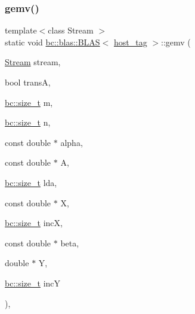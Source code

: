 \subsubsection{\texorpdfstring{gemv()}{gemv()}\hspace{0.1cm}{\footnotesize\ttfamily [1/2]}}
{\footnotesize\ttfamily template$<$class Stream $>$ \\
static void \hyperlink{structbc_1_1blas_1_1BLAS}{bc\+::blas\+::\+B\+L\+AS}$<$ \hyperlink{structbc_1_1host__tag}{host\+\_\+tag} $>$\+::gemv (\begin{DoxyParamCaption}\item[{\hyperlink{classbc_1_1streams_1_1Stream}{Stream}}]{stream,  }\item[{bool}]{transA,  }\item[{\hyperlink{namespacebc_aaf8e3fbf99b04b1b57c4f80c6f55d3c5}{bc\+::size\+\_\+t}}]{m,  }\item[{\hyperlink{namespacebc_aaf8e3fbf99b04b1b57c4f80c6f55d3c5}{bc\+::size\+\_\+t}}]{n,  }\item[{const double $\ast$}]{alpha,  }\item[{const double $\ast$}]{A,  }\item[{\hyperlink{namespacebc_aaf8e3fbf99b04b1b57c4f80c6f55d3c5}{bc\+::size\+\_\+t}}]{lda,  }\item[{const double $\ast$}]{X,  }\item[{\hyperlink{namespacebc_aaf8e3fbf99b04b1b57c4f80c6f55d3c5}{bc\+::size\+\_\+t}}]{incX,  }\item[{const double $\ast$}]{beta,  }\item[{double $\ast$}]{Y,  }\item[{\hyperlink{namespacebc_aaf8e3fbf99b04b1b57c4f80c6f55d3c5}{bc\+::size\+\_\+t}}]{incY }\end{DoxyParamCaption})\hspace{0.3cm}{\ttfamily [inline]}, {\ttfamily [static]}}

\mbox{\label{structbc_1_1blas_1_1BLAS_3_01host__tag_01_4_abbac6084a0a50374a81fe79e3ad303c4}} 
